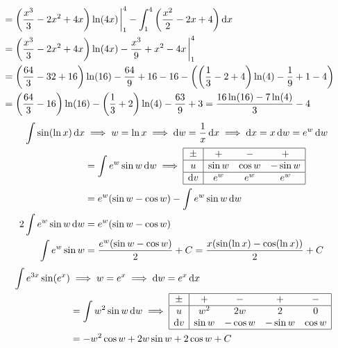 \documentclass{article}
\begin{document}
\begin{tasks}[style = enumerate]
\begin{align*}
\begin{array}{|c|cc|}
								\end{array} \\
							&= \left(\frac{x^3}{3} - 2x^2 + 4x\right)\ln(4x) \eval_1^4 - \int_1^4 \left(\frac{x^2}{2} - 2x + 4\right) \dd{x} \\
							&= \left(\frac{x^3}{3} - 2x^2 + 4x\right)\ln(4x) - \frac{x^3}{9} + x^2 -4x \eval_1^4 \\
							&= \left(\frac{64}{3} - 32 + 16\right)\ln(16) - \frac{64}{9} +16 - 16 - \left(\left(\frac{1}{3} - 2 + 4\right)\ln(4) - \frac{1}{9} + 1 - 4\right) \\
							&= \left(\frac{64}{3} - 16\right)\ln(16) - \left(\frac{1}{3} + 2\right)\ln(4) - \frac{63}{9} + 3
								= \frac{16\ln(16) - 7\ln(4)}{3} - 4
					\end{align*}
				\task
					\begin{align*}
						\int \sin(\ln x) \dd{x} &\implies w = \ln x
								\implies \dd{w} = \frac{1}{x}\dd{x} 
								\implies \dd{x} = x\dd{w} = e^w\dd{w}\\
							&= \int e^w\sin w \dd{w}
								\implies
									\begin{array}{|c|ccc|}\hline
										\pm & + & - & + \\\hline
										u & \sin w & \cos w & -\sin w \\\hline
										\dd{v} & e^w & e^w & e^w \\\hline
									\end{array} \\
							&= e^w(\sin w - \cos w) - \int e^w\sin w \dd{w} \\
						2\int e^w\sin w \dd{w} &= e^w(\sin w - \cos w) \\
						\int e^w\sin w &= \frac{e^w(\sin w - \cos w)}{2} + C
							= \frac{x(\sin(\ln x) - \cos(\ln x))}{2} + C
					\end{align*}
				\task
					\begin{align*}
						\int e^{3x} \sin(e^x) &\implies w = e^x
								\implies \dd{w} = e^x\dd{x} \\
							&= \int w^2\sin w \dd{w}
								\implies
									\begin{array}{|c|cccc|}\hline
										\pm & + & - & + & - \\\hline
										u & w^2 & 2w & 2 & 0 \\
										\dd{v} & \sin w & -\cos w & -\sin w & \cos w \\\hline
									\end{array} \\
							&= -w^2\cos w + 2w\sin w + 2\cos w + C

\end{align*}
\end{tasks}
\end{document}
